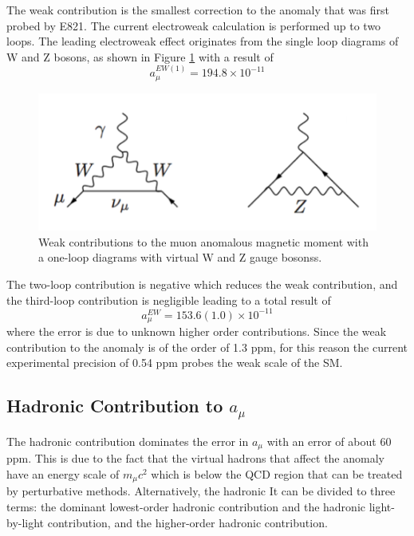 \documentclass{outhesis}
\begin{document}
The weak contribution is the smallest correction to the anomaly that was first probed by E821.
The current electroweak calculation is performed up to two loops.
The leading electroweak effect originates from the single loop diagrams of W and Z bosons, as shown in Figure \ref{fig:weak} with a result of
\begin{equation}
a_{\mu}^{EW(1)} = 194.8 \times 10^{-11} 
\end{equation}
\begin{figure}
  \centering
  \includegraphics[scale=0.5]{figures/wz}
   \caption{Weak contributions to the muon anomalous magnetic moment with a one-loop diagrams with virtual W and Z gauge bosonss. }
  \label{fig:weak}
\end{figure}
The two-loop contribution is negative which reduces the weak contribution, and the third-loop contribution is negligible leading to a total result of 
\begin{equation}
a_{\mu}^{EW} = 153.6(1.0) \times 10^{-11} 
\end{equation}
where the error is due to unknown higher order contributions.
Since the weak contribution to the anomaly is of the order of 1.3 ppm, for this reason the current experimental precision of 0.54 ppm probes the weak scale of the SM. 

\subsection{Hadronic Contribution to $a_{\mu}$}

The hadronic contribution dominates the error in $a_{\mu}$ with an error of about 60 ppm. %
This is due to the fact that the virtual hadrons that affect the anomaly have an energy scale of $m_{\mu}c^2$ which is below the QCD region that can be treated by perturbative methods. Alternatively, the hadronic 
It can be divided to three terms: the dominant lowest-order hadronic contribution and the hadronic light-by-light contribution, and the higher-order hadronic contribution.
\end{document}

